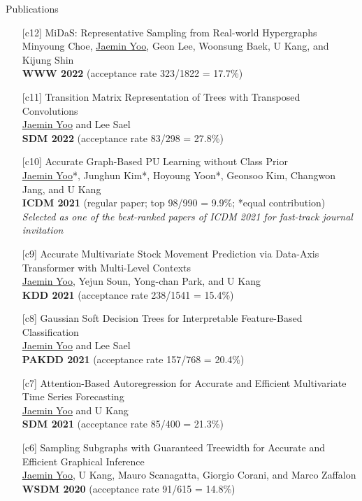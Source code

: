 \documentclass{resume} %
\begin{document}
\begin{rSection}{Publications}
\begin{enumerate}[leftmargin=*]
	\item[{[c12]}]
		MiDaS: Representative Sampling from Real-world Hypergraphs \\
		Minyoung Choe, \underline{Jaemin Yoo}, Geon Lee, Woonsung Baek, U Kang, and Kijung Shin \\
		\textbf{WWW 2022} (acceptance rate 323/1822 = 17.7\%) \\

	\item[{[c11]}]
		Transition Matrix Representation of Trees with Transposed Convolutions \\
		\underline{Jaemin Yoo} and Lee Sael \\
		\textbf{SDM 2022} (acceptance rate 83/298 = 27.8\%) \\

	\item[{[c10]}]
		Accurate Graph-Based PU Learning without Class Prior \\
		\underline{Jaemin Yoo}*, Junghun Kim*, Hoyoung Yoon*, Geonsoo Kim, Changwon Jang, and U Kang \\
		\textbf{ICDM 2021} (regular paper; top 98/990 = 9.9\%; *equal contribution) \\
		\emph{Selected as one of the best-ranked papers of ICDM 2021 for fast-track journal invitation}

	\item[{[c9]}]
		Accurate Multivariate Stock Movement Prediction via Data-Axis Transformer with Multi-Level Contexts  \\
		\underline{Jaemin Yoo}, Yejun Soun, Yong-chan Park, and U Kang \\
		\textbf{KDD 2021} (acceptance rate 238/1541 = 15.4\%)

	\item[{[c8]}]
		Gaussian Soft Decision Trees for Interpretable Feature-Based Classification \\
		\underline{Jaemin Yoo} and Lee Sael \\
		\textbf{PAKDD 2021} (acceptance rate 157/768 = 20.4\%)
		
	\item[{[c7]}]
		Attention-Based Autoregression for Accurate and Efficient Multivariate Time Series Forecasting \\
		\underline{Jaemin Yoo} and U Kang \\
		\textbf{SDM 2021} (acceptance rate 85/400 = 21.3\%)

	\item[{[c6]}]
		Sampling Subgraphs with Guaranteed Treewidth for Accurate and Efficient Graphical Inference \\
		\underline{Jaemin Yoo}, U Kang, Mauro Scanagatta, Giorgio Corani, and Marco Zaffalon \\
		\textbf{WSDM 2020} (acceptance rate 91/615 = 14.8\%)


\end{enumerate}
\end{rSection}
\end{document}
